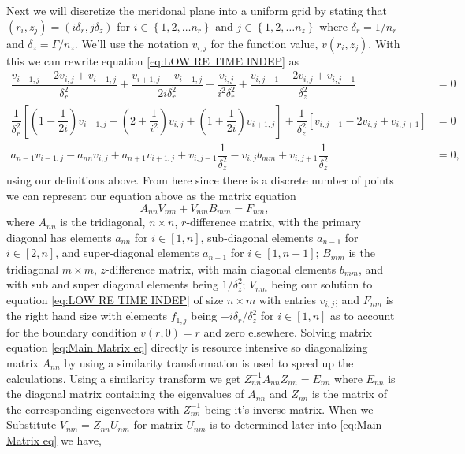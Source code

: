 \documentclass[11pt,letterpaper]{article}
\newcommand{\fpar}[1]{\left({#1}\right)} %
\newcommand{\fbrac}[1]{\left[{#1}\right]} %
\begin{document}
Next we will discretize the meridonal plane into a uniform grid by stating that $(r_i,z_j) = (i\delta_r, j\delta_z)$ for $i\in\left\{1,2,\dots n_r\right\}$ and $j\in\left\{1,2,\dots n_z\right\}$ where $\delta_r = 1/n_r$ and $\delta_z = {\Gamma}/{n_z}$.
We'll use the notation $v_{i,j}$ for the function value, $v(r_i,z_j)$. With this we can rewrite equation \eqref{eq:LOW RE TIME INDEP}
as
\begin{align}
    \dfrac{v_{i+1,j} -2v_{i,j} + v_{i-1,j}}{\delta_r^2} + \dfrac{v_{i+1,j}-v_{i-1,j}}{2i\delta_r^2} - \dfrac{v_{i,j}}{i^2\delta^2_r} +\dfrac{v_{i,j+1} - 2v_{i,j} + v_{i,j-1}}{\delta_z^2} &= 0\nonumber\\
    \dfrac{1}{\delta_r^2}\fbrac{\fpar{1-\dfrac{1}{2i}}v_{i-1,j} - \fpar{2+\dfrac{1}{i^2}}v_{i,j} +\fpar{1+\dfrac{1}{2i}}v_{i+1,j}} + \dfrac{1}{\delta_z^2}\fbrac{v_{i,j-1}-2v_{i,j}+v_{i,j+1}} &= 0\\
    a_{n-1}v_{i-1,j} - a_{nn}v_{i,j} + a_{n+1}v_{i+1,j} + v_{i,j-1}\dfrac{1}{\delta_z^2} - v_{i,j}b_{mm} + v_{i,j+1}\dfrac{1}{\delta_z^2} &= 0,
\end{align}
using our definitions above. From here since there is a discrete number of points we can represent our equation above as the matrix equation
\begin{equation}\label{eq:Main Matrix eq}
    A_{nn}V_{nm}+V_{nm}B_{mm} = F_{nm},
\end{equation}
where $A_{nn}$ is the tridiagonal, $n\times n$, $r$-difference matrix, with the primary diagonal has elements $a_{nn}$ for $i\in[1,n]$, sub-diagonal elements $a_{n-1}$ for $i\in[2,n]$, and super-diagonal elements $a_{n+1}$ for $i\in[1,n-1]$; $B_{mm}$ is the tridiagonal $m\times m$, $z$-difference matrix, with main diagonal elements $b_{mm}$, and with sub and super diagonal elements being $1/\delta_z^2$; $V_{nm}$ being our solution to equation \eqref{eq:LOW RE TIME INDEP} of size $n\times m$ with entries $v_{i,j}$; and $F_{nm}$ is the right hand size with elements $f_{1,j}$ being $-i \delta_r/\delta_z^2$ for $i\in[1,n]$ as to account for the boundary condition $v(r,0) = r$ and zero elsewhere. Solving matrix equation \eqref{eq:Main Matrix eq} directly is resource intensive so diagonalizing matrix $A_{nn}$ by using a similarity transformation is used to speed up the calculations. \newline
Using a similarity transform we get $Z_{nn}^{-1}A_{nn}Z_{nn} = E_{nn}$ where $E_{nn}$ is the diagonal matrix containing the eigenvalues of $A_{nn}$ and $Z_{nn}$ is the matrix of the corresponding eigenvectors with $Z_{nn}^{-1}$ being it's inverse matrix. When we Substitute $V_{nm} =  Z_{nn}U_{nm}$ for matrix $U_{nm}$ is to determined later into \eqref{eq:Main Matrix eq} we have,
\end{document}
